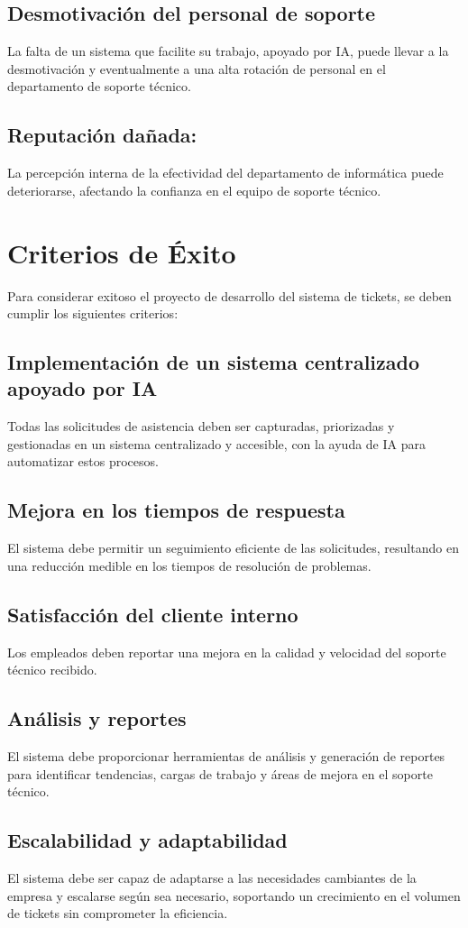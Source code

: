 \documentclass[a4paper,12pt]{article}
\begin{document}
\subsection{Desmotivación del personal de soporte}
La falta de un sistema que facilite su trabajo, apoyado por IA, puede llevar a la desmotivación y eventualmente a una alta rotación de personal en el departamento de soporte técnico.
\subsection{Reputación dañada:}
La percepción interna de la efectividad del departamento de informática puede deteriorarse, afectando la confianza en el equipo de soporte técnico.


\section{Criterios de Éxito}
Para considerar exitoso el proyecto de desarrollo del sistema de tickets, se deben cumplir los siguientes criterios:

\subsection{Implementación de un sistema centralizado apoyado por IA}
Todas las solicitudes de asistencia deben ser capturadas, priorizadas y gestionadas en un sistema centralizado y accesible, con la ayuda de IA para automatizar estos procesos.

\subsection{Mejora en los tiempos de respuesta}
El sistema debe permitir un seguimiento eficiente de las solicitudes, resultando en una reducción medible en los tiempos de resolución de problemas.


\subsection{Satisfacción del cliente interno}
Los empleados deben reportar una mejora en la calidad y velocidad del soporte técnico recibido.


\subsection{Análisis y reportes}
El sistema debe proporcionar herramientas de análisis y generación de reportes para identificar tendencias, cargas de trabajo y áreas de mejora en el soporte técnico.

\subsection{Escalabilidad y adaptabilidad}
El sistema debe ser capaz de adaptarse a las necesidades cambiantes de la empresa y escalarse según sea necesario, soportando un crecimiento en el volumen de tickets sin comprometer la eficiencia.

\newpage
\end{document}
